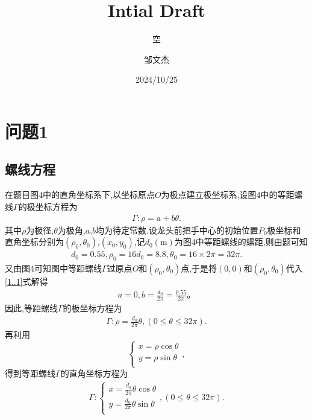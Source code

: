 \documentclass[lang=cn,newtx,10pt,scheme=chinese]{../Template/elegantbook}
\title{Intial Draft}
\subtitle{空}
\author{邹文杰}
\institute{无}
\date{2024/10/25}
\begin{document}
\maketitle

\frontmatter

\tableofcontents

\mainmatter


\chapter{问题1}

\section{螺线方程}

在题目图4中的直角坐标系下,以坐标原点\(O\)为极点建立极坐标系,设图4中的等距螺线\(\varGamma\)的极坐标方程为
\begin{align}\label{1..1}
\varGamma :\rho =a+b\theta.
\end{align}
其中\(\rho\)为极径,\(\theta\)为极角,\(a\),\(b\)均为待定常数.设龙头前把手中心的初始位置\(P_0\)极坐标和直角坐标分别为\((\rho _0,\theta _0)\),\((x_0,y_0)\),记\(d_0(\mathrm{m})\)为图4中等距螺线的螺距,则由题可知
\begin{align}
d_0 = 0.55,\rho _0 = 16d_0 = 8.8,\theta _0 = 16\times 2\pi = 32\pi.
\end{align}
又由图4可知图中等距螺线\(\varGamma\)过原点\(O\)和\((\rho _0,\theta _0)\)点,于是将\((0,0)\)和\((\rho _0,\theta _0)\)代入\eqref{1..1}式解得
\begin{align}
    a = 0,b = \frac{d_0}{2\pi}=\frac{0.55}{2\pi}。
\end{align}
因此,等距螺线\(\varGamma\)的极坐标方程为
\begin{align}
\varGamma :\rho =\frac{d_0}{2\pi}\theta ,(0\leqslant \theta \leqslant 32\pi) .\label{0.1}
\end{align}
再利用
\[\begin{cases}
x=\rho \cos \theta\\
y=\rho \sin \theta\\
\end{cases},\]
得到等距螺线\(\varGamma\)的直角坐标方程为
\begin{align}
\varGamma:\begin{cases}
x=\frac{d_0}{2\pi}\theta \cos \theta\\
y=\frac{d_0}{2\pi}\theta \sin \theta\\
\end{cases},(0\leqslant \theta \leqslant 32\pi) .\label{0.0}
\end{align}
\end{document}
